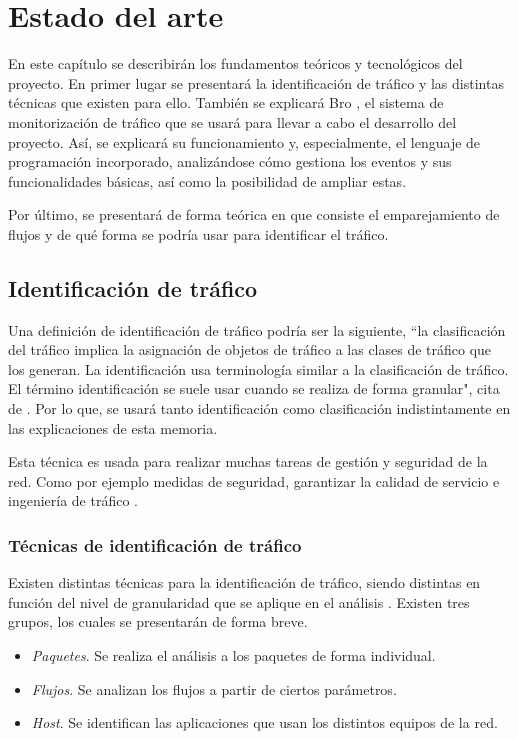 \chapter{Estado del arte}\label{estadoarte}

En este capítulo se describirán los fundamentos teóricos y tecnológicos del proyecto. En primer lugar se presentará 
la identificación de tráfico y las distintas técnicas que existen para ello. También se explicará Bro \cite{broindex}, el 
sistema de monitorización de tráfico que se usará para llevar a cabo el desarrollo del proyecto. Así, se explicará su funcionamiento 
y, especialmente, el lenguaje de programación incorporado, analizándose cómo gestiona los eventos y sus funcionalidades básicas, así 
como la posibilidad de ampliar estas.

\intro Por último, se presentará de forma teórica en que consiste el emparejamiento de flujos y de qué forma se podría usar para 
identificar el tráfico.

\section{Identificación de tráfico}

Una definición de identificación de tráfico podría ser la siguiente, ``la clasificación del tráfico implica la asignación de objetos 
de tráfico a las clases de tráfico que los generan. La identificación usa terminología similar a la clasificación de tráfico. El 
término identificación se suele usar cuando se realiza de forma granular", cita de \cite{khalife2014}. Por lo que, se usará tanto 
identificación como clasificación indistintamente en las explicaciones de esta memoria.

\intro Esta técnica es usada para realizar muchas tareas de gestión y seguridad de la red. Como por ejemplo medidas de seguridad, 
garantizar la calidad de servicio \cite{microqos} e ingeniería de tráfico \cite{khalife2016}.

\subsection{Técnicas de identificación de tráfico}

Existen distintas técnicas para la identificación de tráfico, siendo distintas en función del nivel de granularidad que se aplique en 
el análisis \cite{khalife2016}. Existen tres grupos, los cuales se presentarán de forma breve.

\begin{itemize}
\item \textit{Paquetes}. Se realiza el análisis a los paquetes de forma individual.
\item \textit{Flujos}. Se analizan los flujos a partir de ciertos parámetros.
\item \textit{Host}. Se identifican las aplicaciones que usan los distintos equipos de la red.
\end{itemize}

